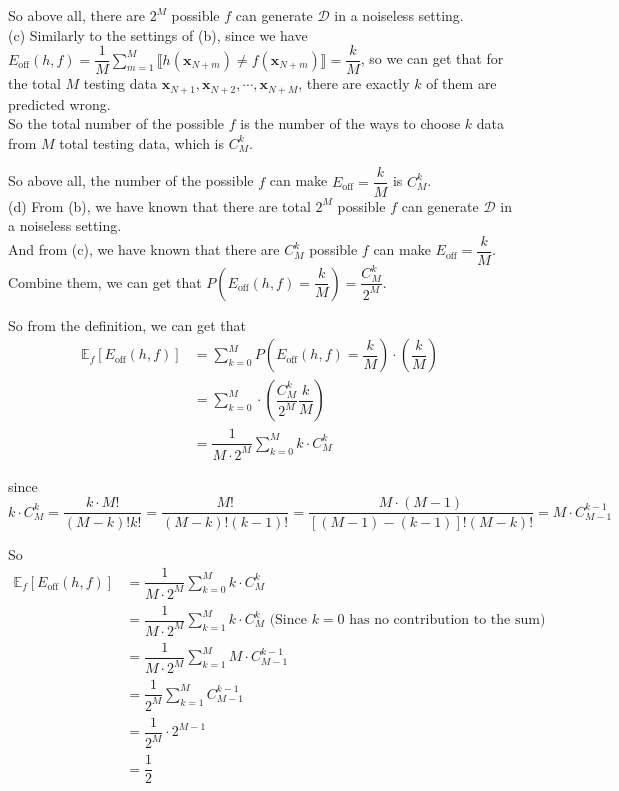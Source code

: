 \documentclass[10pt]{article}
\renewcommand{\mathbf}{\boldsymbol}
\begin{document}
So above all, there are $2^M$ possible $f$ can generate $\mathcal{D}$ in a noiseless setting.\\


(c) Similarly to the settings of (b), since we have $E_{\text{off}}(h,f)=\dfrac{1}{M}\sum\limits_{m=1}^M \llbracket h\left(\mathbf{x}_{N+m}\right) \neq f\left(\mathbf{x}_{N+m}\right) \rrbracket=\dfrac{k}{M}$,
so we can get that for the total $M$ testing data $\mathbf{x}_{N+1}, \mathbf{x}_{N+2}, \cdots, \mathbf{x}_{N+M}$, there are exactly $k$ of them are predicted wrong.\\
So the total number of the possible $f$ is the number of the ways to choose $k$ data from $M$ total testing data, which is $C_M^k$.

So above all, the number of the possible $f$ can make $E_{\text{off}}=\dfrac{k}{M}$ is $C_M^k$.\\


(d) From (b), we have known that there are total $2^M$ possible $f$ can generate $\mathcal{D}$ in a noiseless setting.\\
And from (c), we have known that there are $C_M^k$ possible $f$ can make $E_{\text{off}}=\dfrac{k}{M}$.\\
Combine them, we can get that $P(E_{\text{off}}(h,f)=\dfrac{k}{M})=\dfrac{C_M^k}{2^M}$.

So from the definition, we can get that
\begin{align*}
	\mathbb{E}_f[E_{\text{off}}(h,f)] &= \sum_{k=0}^M P(E_{\text{off}}(h,f)=\dfrac{k}{M})\cdot (\dfrac{k}{M}) \\
							   &= \sum_{k=0}^M \cdot (\dfrac{C_M^k}{2^M}\dfrac{k}{M}) \\
							   &= \dfrac{1}{M\cdot 2^M}\sum_{k=0}^M k\cdot C_M^k
\end{align*}

since
$$k\cdot C_M^k=\dfrac{k\cdot M!}{(M-k)!k!}=\dfrac{M!}{(M-k)!(k-1)!}=\dfrac{M\cdot (M-1)}{[(M-1)-(k-1)]!(M-k)!}=M\cdot C_{M-1}^{k-1}$$

So 
\begin{align*}
	\mathbb{E}_f[E_{\text{off}}(h,f)] &= \dfrac{1}{M\cdot 2^M}\sum_{k=0}^M k\cdot C_M^k\\
							   &= \dfrac{1}{M\cdot 2^M}\sum_{k=1}^M k\cdot C_M^k \text{\ \ \ \ (Since $k=0$ has no contribution to the sum)}\\
							   &= \dfrac{1}{M\cdot 2^M}\sum_{k=1}^M M\cdot C_{M-1}^{k-1}\\
							   &= \dfrac{1}{2^M}\sum_{k=1}^M C_{M-1}^{k-1}\\
							   &= \dfrac{1}{2^M} \cdot 2^{M-1}\\
							   &= \dfrac{1}{2}
\end{align*}
\end{document}
